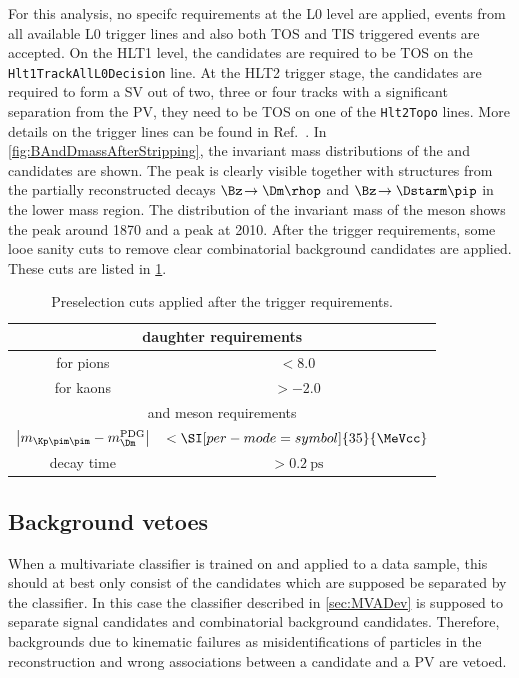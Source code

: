 For this analysis, no specifc requirements at the L0 level are applied, \ie events from all available L0 trigger lines and also both TOS and TIS triggered events are accepted.
On the HLT1 level, the \Bz candidates are required to be TOS on the \verb!Hlt1TrackAllL0Decision! line.
At the HLT2 trigger stage, the \BdToDpi candidates are required to form a \ac{SV} out of two, three or four tracks with a significant separation from the \ac{PV}, \ie they need to be TOS on one of the \verb!Hlt2Topo! lines. More details on the trigger lines can be found in Ref.~\cite{Trigger_Gligorov}.
In \cref{fig:BAndDmassAfterStripping}, the invariant mass distributions of the \Bz and \Dm candidates are shown. The \Bz peak is clearly visible together with structures from the partially reconstructed decays $\Bz\!\to\Dm\rhop$ and $\Bz\!\to\Dstarm\pip$ in the lower mass region.
The distribution of the invariant mass of the \D meson shows the \Dm peak around \SI[per-mode=symbol]{1870}{\MeVcc} and a \Dstarm peak at \SI[per-mode=symbol]{2010}{\MeVcc}.
After the trigger requirements, some looe sanity cuts to remove clear combinatorial background candidates are applied.
These cuts are listed in \cref{tab:preselection}.
\begin{table}[tbp]
	\centering
	\caption{Preselection cuts applied after the trigger requirements.}
	\begin{tabular}{cc}
		\toprule
		\multicolumn{2}{c}{\Dm daughter requirements}\\
		\midrule
		\dllkpi for pions	& $<8.0$ \\
		\dllkpi for kaons 	& $>-2.0$ \\
		\midrule
		\multicolumn{2}{c}{\Dm  and \Bz meson requirements}\\
		\midrule
		$\left|m_{\Kp\pim\pim}-m_\Dm^{\text{PDG}}\right|$	& $<\SI[per-mode=symbol]{35}{\MeVcc}$ \\
		\Bz decay time										& $>\SI{0.2}{\pico\second}$ \\
		\bottomrule
	\end{tabular}
	\label{tab:preselection}
\end{table}

\subsection{Background vetoes}
\label{sec:vetoes}

When a multivariate classifier is trained on and applied to a data sample, this should at best only consist of the candidates which are supposed be separated by the classifier.
In this case the classifier described in \cref{sec:MVADev} is supposed to separate \BdToDpi signal candidates and combinatorial background candidates.
Therefore, backgrounds due to kinematic failures as misidentifications of particles in the reconstruction and wrong associations between a \Bz candidate and a \ac{PV} are vetoed.

